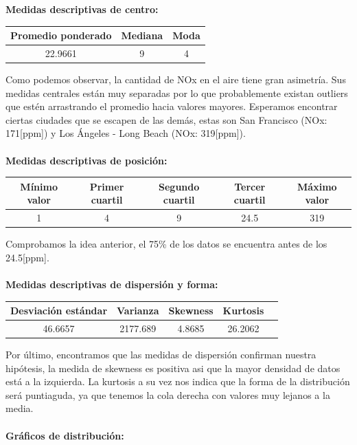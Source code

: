 \documentclass[11pt]{article}
\begin{document}
\textbf{Medidas descriptivas de centro:}

\begin{center}
\begin{tabular}{|c|c|c|}
    \hline
    Promedio ponderado & Mediana & Moda \\ \hline
    22.9661 & 9 & 4 \\
    \hline
\end{tabular}
\end{center}

Como podemos observar, la cantidad de NOx en el aire tiene gran asimetría. Sus medidas centrales están muy separadas por lo que probablemente existan outliers que estén arrastrando el promedio hacia valores mayores. Esperamos encontrar ciertas ciudades que se escapen de las demás, estas son San Francisco (NOx: 171[ppm]) y Los Ángeles - Long Beach (NOx: 319[ppm]).
\\
\\
\textbf{Medidas descriptivas de posición:}

\begin{center}
\begin{tabular}{|c|c|c|c|c|}
    \hline
    Mínimo valor & Primer cuartil & Segundo cuartil & Tercer cuartil & Máximo valor\\ \hline
    1 & 4 & 9 & 24.5 & 319\\
    \hline
\end{tabular}
\end{center}

Comprobamos la idea anterior, el 75\% de los datos se encuentra antes de los 24.5[ppm].
\\
\\
\textbf{Medidas descriptivas de dispersión y forma:}

\begin{center}
\begin{tabular}{|c|c|c|c|c|}
    \hline
    Desviación estándar  & Varianza & Skewness & Kurtosis\\ \hline
    46.6657 & 2177.689 & 4.8685 & 26.2062\\
    \hline
\end{tabular}
\end{center}

Por último, encontramos que las medidas de dispersión confirman nuestra hipótesis, la medida de skewness es positiva asi que la mayor densidad de datos está a la izquierda. La kurtosis a su vez nos indica que la forma de la distribución será puntiaguda, ya que tenemos la cola derecha con valores muy lejanos a la media.
\\
\\
\textbf{Gráficos de distribución:}
\\
\end{document}
